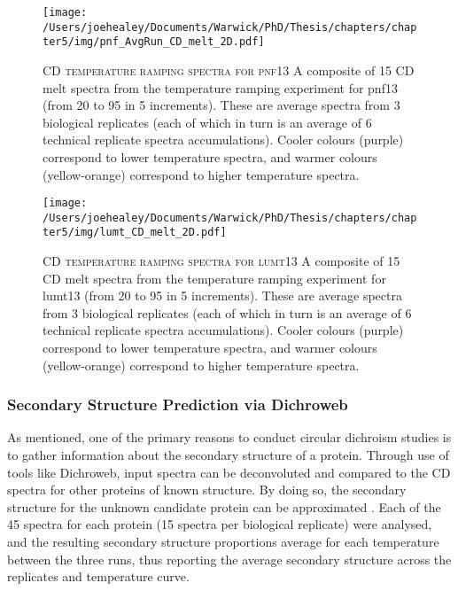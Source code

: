 \begin{figure}[p]

	\centering
	\texttt{[image: /Users/joehealey/Documents/Warwick/PhD/Thesis/chapters/chapter5/img/pnf\_AvgRun\_CD\_melt\_2D.pdf]}
	\captionsetup{singlelinecheck=off, justification=justified, font=footnotesize, aboveskip=10pt}
	\caption[pnf13 CD melt plot]{\textsc{\normalsize CD temperature ramping spectra for pnf13}\vspace{0.1cm} \newline A composite of 15 CD melt spectra from the temperature ramping experiment for pnf13 (from 20\degC{} to 95\degC{} in 5\degC{} increments). These are average spectra from 3 biological replicates (each of which in turn is an average of 6 technical replicate spectra accumulations). Cooler colours (purple) correspond to lower temperature spectra, and warmer colours (yellow-orange) correspond to higher temperature spectra.}
	\label{pnfmelt}
	\end{figure}
	
\begin{figure}[p]

	\centering
	\texttt{[image: /Users/joehealey/Documents/Warwick/PhD/Thesis/chapters/chapter5/img/lumt\_CD\_melt\_2D.pdf]}
	\captionsetup{singlelinecheck=off, justification=justified, font=footnotesize, aboveskip=10pt}
	\caption[lumt13 CD melt plot]{\textsc{\normalsize CD temperature ramping spectra for lumt13}\vspace{0.1cm} \newline A composite of 15 CD melt spectra from the temperature ramping experiment for lumt13 (from 20\degC{} to 95\degC{} in 5\degC{} increments). These are average spectra from 3 biological replicates (each of which in turn is an average of 6 technical replicate spectra accumulations). Cooler colours (purple) correspond to lower temperature spectra, and warmer colours (yellow-orange) correspond to higher temperature spectra.}
	\label{lumtmelt}
\end{figure}

\subsubsection{Secondary Structure Prediction via Dichroweb}
As mentioned, one of the primary reasons to conduct circular dichroism studies is to gather information about the secondary structure of a protein. Through use of tools like Dichroweb, input spectra can be deconvoluted and compared to the CD spectra for other proteins of known structure. By doing so, the secondary structure for the unknown candidate protein can be approximated \citep{Whitmore2004, Lobley2002}. Each of the 45 spectra for each protein (15 spectra per biological replicate) were analysed, and the resulting secondary structure proportions average for each temperature between the three runs, thus reporting the average secondary structure across the replicates and temperature curve.

